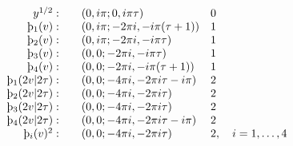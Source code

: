 \begin{equation*}
  \begin{array}{rll}
       y^{1/2}:& \quad (0,i\pi;0,i\pi\tau) &0 \\
   \th_1(v):&\quad (0,i\pi;-2\pi i, -i\pi(\tau+1)) &1  \\
   \th_2(v):&\quad (0,i\pi;-2\pi i, -i\pi\tau)  &1\\
   \th_3(v):&\quad (0,0;-2\pi i, -i\pi\tau) &1 \\
   \th_4(v):&\quad (0,0;-2\pi i, -i\pi(\tau+1)) &1 \\
   \th_1(2v|2\tau):&\quad (0,0;-4\pi i, -2\pi i\tau-i\pi) &2 \\
   \th_2(2v|2\tau):&\quad (0,0;-4\pi i, -2\pi i\tau) &2 \\
   \th_3(2v|2\tau):&\quad (0,0;-4\pi i, -2\pi i\tau) &2 \\
   \th_4(2v|2\tau):&\quad (0,0;-4\pi i, -2\pi i\tau-i\pi) &2 \\
   \th_i(v)^2:&\quad (0,0;-4\pi i, -2\pi i\tau) &2,\quad i=1,\dots,4
  \end{array}
\end{equation*}

